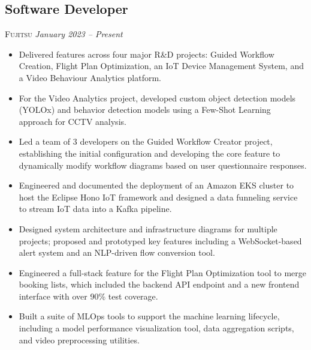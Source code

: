 \documentclass[a4paper, 12pt]{article} %
\begin{document}
\subsection{Software Developer}
\textsc{Fujitsu} \textit{January 2023 – Present}
\begin{itemize}
    \itemsep -0.5em %
    \item Delivered features across four major R\&D projects: Guided Workflow Creation, Flight Plan Optimization, an IoT Device Management System, and a Video Behaviour Analytics platform.
    \item For the Video Analytics project, developed custom object detection models (YOLOx) and behavior detection models using a Few-Shot Learning approach for CCTV analysis.
    \item Led a team of 3 developers on the Guided Workflow Creator project, establishing the initial configuration and developing the core feature to dynamically modify workflow diagrams based on user questionnaire responses.
    \item Engineered and documented the deployment of an Amazon EKS cluster to host the Eclipse Hono IoT framework and designed a data funneling service to stream IoT data into a Kafka pipeline.
    \item Designed system architecture and infrastructure diagrams for multiple projects; proposed and prototyped key features including a WebSocket-based alert system and an NLP-driven flow conversion tool.
    \item Engineered a full-stack feature for the Flight Plan Optimization tool to merge booking lists, which included the backend API endpoint and a new frontend interface with over 90\% test coverage.
    \item Built a suite of MLOps tools to support the machine learning lifecycle, including a model performance visualization tool, data aggregation scripts, and video preprocessing utilities.
\end{itemize}

\end{document}
